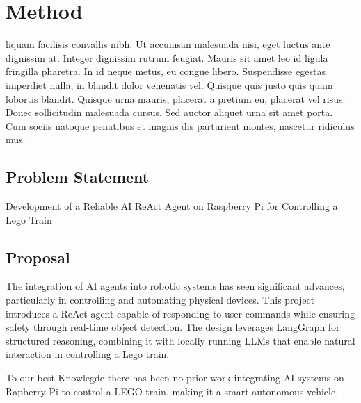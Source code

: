 \chapter{Method}
\label{ch:Method}
liquam facilisis convallis nibh. Ut accumsan malesuada nisi, eget luctus ante dignissim at. Integer dignissim rutrum feugiat. Mauris sit amet leo id ligula fringilla pharetra. In id neque metus, eu congue libero. Suspendisse egestas imperdiet nulla, in blandit dolor venenatis vel. Quisque quis justo quis quam lobortis blandit. Quisque urna mauris, placerat a pretium eu, placerat vel risus. Donec sollicitudin malesuada cursus. Sed auctor aliquet urna sit amet porta. Cum sociis natoque penatibus et magnis dis parturient montes, nascetur ridiculus mus. 

%
%
\section{Problem Statement}
Development of a Reliable AI ReAct Agent on Raspberry Pi for Controlling a Lego Train


%
%
\section{Proposal}

The integration of AI agents into robotic systems has seen significant advances, particularly in controlling and automating physical devices. This project introduces a ReAct agent capable of responding to user commands while ensuring safety through real-time object detection. The design leverages LangGraph for structured reasoning, combining it with locally running LLMs that enable natural interaction in controlling a Lego train. 

To our best Knowlegde there has been no prior work integrating AI systems on Rapberry Pi to control a LEGO train, making it a smart autonomous vehicle. 